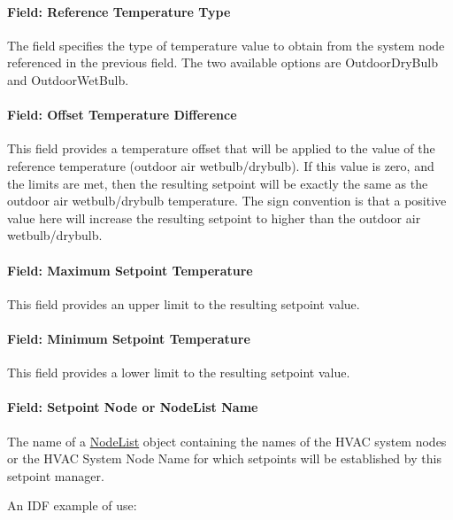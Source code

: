\paragraph{Field: Reference Temperature Type}\label{field-reference-temperature-type}

The field specifies the type of temperature value to obtain from the system node referenced in the previous field. The two available options are OutdoorDryBulb and OutdoorWetBulb.

\paragraph{Field: Offset Temperature Difference}\label{field-offset-temperature-difference}

This field provides a temperature offset that will be applied to the value of the reference temperature (outdoor air wetbulb/drybulb). If this value is zero, and the limits are met, then the resulting setpoint will be exactly the same as the outdoor air wetbulb/drybulb temperature. The sign convention is that a positive value here will increase the resulting setpoint to higher than the outdoor air wetbulb/drybulb.

\paragraph{Field: Maximum Setpoint Temperature}\label{field-maximum-setpoint-temperature-6}

This field provides an upper limit to the resulting setpoint value.

\paragraph{Field: Minimum Setpoint Temperature}\label{field-minimum-setpoint-temperature-6}

This field provides a lower limit to the resulting setpoint value.

\paragraph{Field: Setpoint Node or NodeList Name}\label{field-setpoint-node-or-nodelist-name-19}

The name of a \hyperref[nodelist]{NodeList} object containing the names of the HVAC system nodes or the HVAC System Node Name for which setpoints will be established by this setpoint manager.

An IDF example of use:

